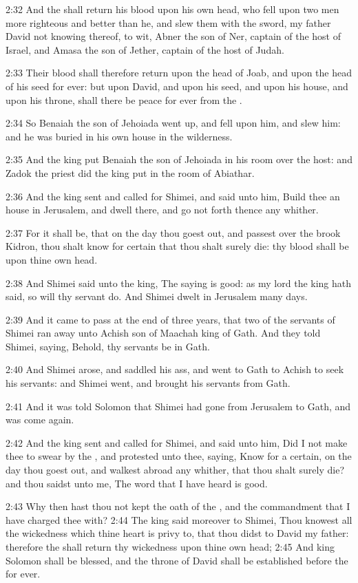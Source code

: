 2:32 And the \LORD shall return his blood upon his own head, who fell
upon two men more righteous and better than he, and slew them with the
sword, my father David not knowing thereof, to wit, Abner the son of
Ner, captain of the host of Israel, and Amasa the son of Jether,
captain of the host of Judah.

2:33 Their blood shall therefore return upon the head of Joab, and
upon the head of his seed for ever: but upon David, and upon his seed,
and upon his house, and upon his throne, shall there be peace for ever
from the \LORD.

2:34 So Benaiah the son of Jehoiada went up, and fell upon him, and
slew him: and he was buried in his own house in the wilderness.

2:35 And the king put Benaiah the son of Jehoiada in his room over the
host: and Zadok the priest did the king put in the room of Abiathar.

2:36 And the king sent and called for Shimei, and said unto him, Build
thee an house in Jerusalem, and dwell there, and go not forth thence
any whither.

2:37 For it shall be, that on the day thou goest out, and passest over
the brook Kidron, thou shalt know for certain that thou shalt surely
die: thy blood shall be upon thine own head.

2:38 And Shimei said unto the king, The saying is good: as my lord the
king hath said, so will thy servant do. And Shimei dwelt in Jerusalem
many days.

2:39 And it came to pass at the end of three years, that two of the
servants of Shimei ran away unto Achish son of Maachah king of Gath.
And they told Shimei, saying, Behold, thy servants be in Gath.

2:40 And Shimei arose, and saddled his ass, and went to Gath to Achish
to seek his servants: and Shimei went, and brought his servants from
Gath.

2:41 And it was told Solomon that Shimei had gone from Jerusalem to
Gath, and was come again.

2:42 And the king sent and called for Shimei, and said unto him, Did I
not make thee to swear by the \LORD, and protested unto thee, saying,
Know for a certain, on the day thou goest out, and walkest abroad any
whither, that thou shalt surely die? and thou saidst unto me, The word
that I have heard is good.

2:43 Why then hast thou not kept the oath of the \LORD, and the
commandment that I have charged thee with?  2:44 The king said
moreover to Shimei, Thou knowest all the wickedness which thine heart
is privy to, that thou didst to David my father: therefore the \LORD
shall return thy wickedness upon thine own head; 2:45 And king Solomon
shall be blessed, and the throne of David shall be established before
the \LORD for ever.


